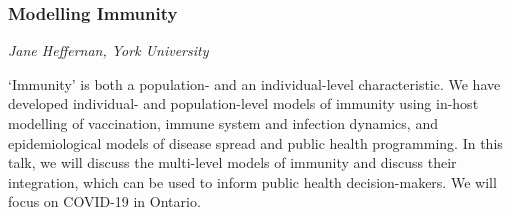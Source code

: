 \subsubsection*{Modelling Immunity}
\textit{Jane Heffernan, York University}

`Immunity' is both a population- and an individual-level characteristic. We have developed individual- and population-level models of immunity using in-host modelling of vaccination, immune system and infection dynamics, and epidemiological models of disease spread and public health programming. In this talk, we will discuss the multi-level models of immunity and discuss their integration, which can be used to inform public health decision-makers. We will focus on COVID-19 in Ontario.

